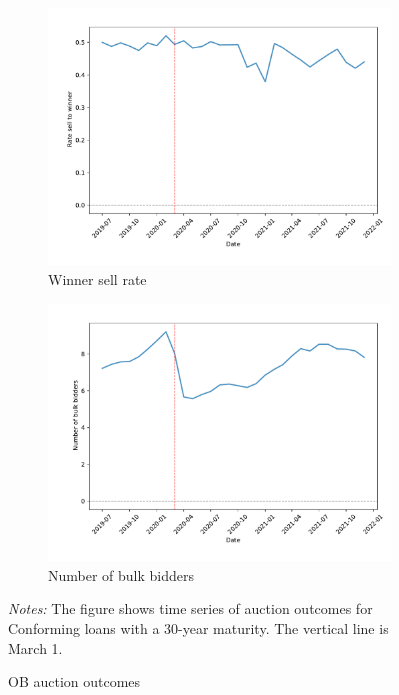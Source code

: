 \documentclass[11pt,a4paper]{article}
\begin{document}
\begin{figure}[h]
\begin{subfigure}[b]{0.49\textwidth}
      \includegraphics[width=0.998\textwidth]{../results/figures/dummy_sell_winner_mean_mat30_loan1_timeseries_nrmonthly_2.5_4_.pdf}
      \caption{ Winner sell rate}
      \end{subfigure}
      \begin{subfigure}[b]{0.49\textwidth}
        \includegraphics[width=0.998\textwidth]{../results/figures/Number of Bulk Bidders_mean_mat30_loan1_timeseries_nrmonthly_2.5_4_.pdf}
        \caption{ Number of bulk bidders}
       \end{subfigure}
     \caption{OB auction outcomes } 
   \begin{minipage}{\textwidth}
      \footnotesize{\textit{Notes:} The figure shows time series of auction outcomes for Conforming loans with a 30-year maturity. The vertical line is March 1.  } 
      \end{minipage}
\end{figure}
\end{document}
